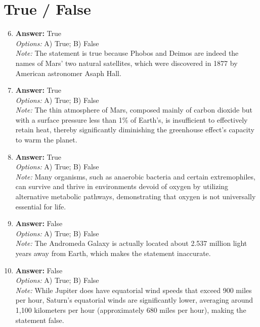 \documentclass[12pt]{article}
\begin{document}
\section*{True / False}
\begin{enumerate}[label=\arabic*.]
\setcounter{enumi}{5}
\item \textbf{Answer:} True
\\ \textit{Options:} A) True; B) False
\\ \textit{Note:} The statement is true because Phobos and Deimos are indeed the names of Mars' two natural satellites, which were discovered in 1877 by American astronomer Asaph Hall.
\item \textbf{Answer:} True
\\ \textit{Options:} A) True; B) False
\\ \textit{Note:} The thin atmosphere of Mars, composed mainly of carbon dioxide but with a surface pressure less than 1\% of Earth's, is insufficient to effectively retain heat, thereby significantly diminishing the greenhouse effect's capacity to warm the planet.
\item \textbf{Answer:} True
\\ \textit{Options:} A) True; B) False
\\ \textit{Note:} Many organisms, such as anaerobic bacteria and certain extremophiles, can survive and thrive in environments devoid of oxygen by utilizing alternative metabolic pathways, demonstrating that oxygen is not universally essential for life.
\item \textbf{Answer:} False
\\ \textit{Options:} A) True; B) False
\\ \textit{Note:} The Andromeda Galaxy is actually located about 2.537 million light years away from Earth, which makes the statement inaccurate.
\item \textbf{Answer:} False
\\ \textit{Options:} A) True; B) False
\\ \textit{Note:} While Jupiter does have equatorial wind speeds that exceed 900 miles per hour, Saturn's equatorial winds are significantly lower, averaging around 1,100 kilometers per hour (approximately 680 miles per hour), making the statement false.
\end{enumerate}
\end{document}
